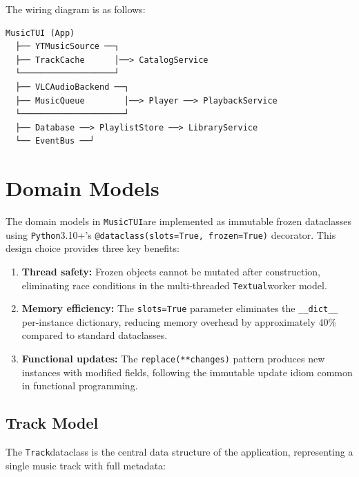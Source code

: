 \documentclass[a4paper,11pt,twoside]{article}
\newcommand{\py}{\texttt{Python}}
\newcommand{\textual}{\texttt{Textual}}
\newcommand{\musictui}{\texttt{MusicTUI}}
\newcommand{\track}{\texttt{Track}}
\DeclareRobustCommand{\method}[1]{\texttt{\def\_{\textunderscore\allowbreak}#1}}
\begin{document}
The wiring diagram is as follows:

\begin{verbatim}
MusicTUI (App)
  ├── YTMusicSource ──┐
  ├── TrackCache      │──> CatalogService
  └───────────────────┘
  ├── VLCAudioBackend ──┐
  ├── MusicQueue        │──> Player ──> PlaybackService
  └─────────────────────┘
  ├── Database ──> PlaylistStore ──> LibraryService
  └── EventBus ──┘
\end{verbatim}

\section{Domain Models}

The domain models in \musictui are implemented as immutable frozen dataclasses
using \py 3.10+'s \texttt{@dataclass(slots=True, frozen=True)} decorator.
This design choice provides three key benefits:

\begin{enumerate}
    \item \textbf{Thread safety:} Frozen objects cannot be mutated after
          construction, eliminating race conditions in the multi-threaded
          \textual worker model.
    \item \textbf{Memory efficiency:} The \texttt{slots=True} parameter
          eliminates the \texttt{\_\_dict\_\_} per-instance dictionary,
          reducing memory overhead by approximately 40\% compared to
          standard dataclasses.
    \item \textbf{Functional updates:} The \method{replace(**changes)}
          pattern produces new instances with modified fields, following
          the immutable update idiom common in functional programming.
\end{enumerate}

\subsection{Track Model}

The \track dataclass is the central data structure of the application,
representing a single music track with full metadata:
\end{document}
